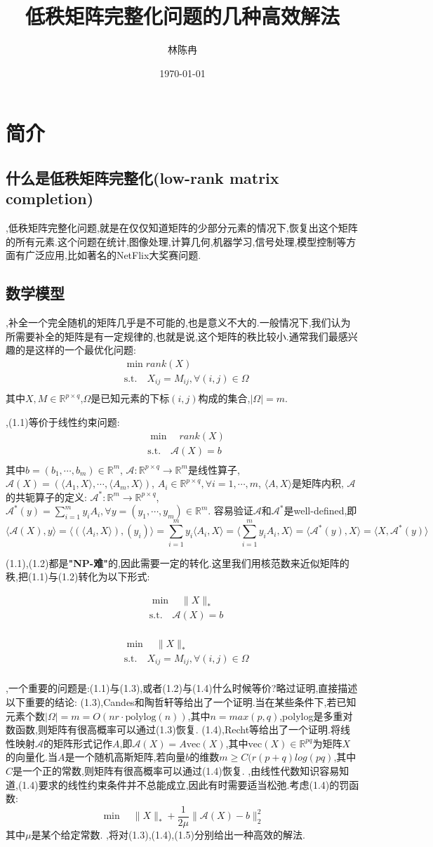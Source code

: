 \documentclass[UTF8]{ctexart}
\title{低秩矩阵完整化问题的几种高效解法}
\author{林陈冉}
\date{\today}
\newcommand{\s}{\quad}
\renewcommand{\b}{\textbf}
\newcommand{\p}{\paragraph{}\s}
\newcommand{\ssect}{\subsection}
\newcommand{\equSplit}[1]{\begin{equation}\begin{split}#1\end{split}\end{equation}}
\newcommand{\equ}[1]{\begin{equation}#1\end{equation}}
\newcommand{\Tst}{\text{s.t.}\s}
\newcommand{\abs}[1]{\lvert#1\rvert}
\newcommand{\norm}[1]{\lVert#1\rVert}
\newcommand{\inprod}[1]{\langle#1\rangle}
\newcommand{\Real}[1]{\mathbb{R}^{#1}}
\newcommand{\nunorm}{\norm{X}_*}
\newcommand{\Ma}{\mathcal{A}}
\numberwithin{equation}{section}
\begin{document}
\maketitle
\section{简介}
\ssect{什么是低秩矩阵完整化(low-rank matrix completion)}

,低秩矩阵完整化问题,就是在仅仅知道矩阵的少部分元素的情况下,恢复出这个矩阵的所有元素.这个问题在统计,图像处理,计算几何,机器学习,信号处理,模型控制等方面有广泛应用,比如著名的NetFlix大奖赛问题.

\ssect{数学模型}

,补全一个完全随机的矩阵几乎是不可能的,也是意义不大的.一般情况下,我们认为所需要补全的矩阵是有一定规律的,也就是说,这个矩阵的秩比较小.通常我们最感兴趣的是这样的一个最优化问题:
\equSplit{
	&\min rank(X)\\
	&\Tst X_{ij}=M_{ij},\forall(i,j)\in\Omega\\
}
其中$X,M\in\Real{p\times q}$,$\Omega$是已知元素的下标$(i,j)$构成的集合,$\abs{\Omega}=m$.

,(1.1)等价于线性约束问题:
\equSplit{
	&\min\s rank(X)\\
	&\Tst \mathcal{A}(X)=b\\
}
其中$b=(b_1,\cdots,b_m)\in\Real{m}$,
$\mathcal{A}:\Real{p\times q}\rightarrow\Real{m}$是线性算子,
$\Ma(X)=(\inprod{A_1,X},\cdots,\inprod{A_m,X})$,
$A_i\in\Real{p\times q},\forall i=1,\cdots,m$,
$\inprod{A,X}$是矩阵内积,
$\Ma$的共轭算子的定义:
$\Ma^*:\Real{m}\rightarrow\Real{p\times q}$,
$\Ma^*(y)=\sum^m_{i=1}y_iA_i,\forall y=(y_1,\cdots,y_m)\in\Real{m}$.
容易验证$\Ma$和$\Ma^*$是well-defined,即
\[
	\inprod{\Ma(X),y}=\inprod{(\inprod{A_i,X}),(y_i)}=
	\sum^m_{i=1}y_i\inprod{A_i,X}=\inprod{\sum^m_{i=1}y_iA_i,X}
	=\inprod{\Ma^*(y),X}=\inprod{X,\Ma^*(y)}
\]

(1.1),(1.2)都是\b{"NP-难"}的,因此需要一定的转化.这里我们用核范数来近似矩阵的秩,把(1.1)与(1.2)转化为以下形式:

\equSplit{
	&\min\s\nunorm\\
	&\Tst \mathcal{A}(X)=b\\	
}

\equSplit{
	&\min\s\nunorm\\
	&\Tst X_{ij}=M_{ij},\forall(i,j)\in\Omega\\
}

,一个重要的问题是:(1.1)与(1.3),或者(1.2)与(1.4)什么时候等价?略过证明,直接描述以下重要的结论:
(1.3),Candes和陶哲轩等给出了一个证明.当在某些条件下,若已知元素个数$\abs{\Omega}=m=O(nr\cdot\text{polylog}(n))$,其中$n=max(p,q)$,polylog是多重对数函数,则矩阵有很高概率可以通过(1.3)恢复.
(1.4),Recht等给出了一个证明.将线性映射$\mathcal{A}$的矩阵形式记作$A$,即$\mathcal{A}(X)=A\text{vec}(X)$,其中$\text{vec}(X)\in\Real{pq}$为矩阵$X$的向量化.当$A$是一个随机高斯矩阵,若向量$b$的维数$m\geq C(r(p+q)log(pq)$,其中$C$是一个正的常数,则矩阵有很高概率可以通过(1.4)恢复.
,由线性代数知识容易知道,(1.4)要求的线性约束条件并不总能成立,因此有时需要适当松弛.考虑(1.4)的罚函数:
\equ{\min\s\nunorm+\frac{1}{2\mu}\norm{\mathcal{A}(X)-b}_2^2}
其中$\mu$是某个给定常数.
,将对(1.3),(1.4),(1.5)分别给出一种高效的解法.
\end{document}
